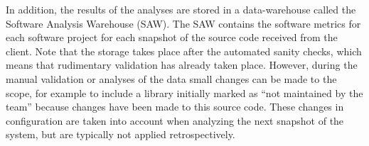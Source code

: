 In addition, the results of the analyses are stored in a data-warehouse called the Software Analysis Warehouse (SAW).
The SAW contains the software metrics for each software project for each snapshot of the source code received from the client.
Note that the storage takes place after the automated sanity checks, which means that rudimentary validation has already taken place.
However, during the manual validation or analyses of the data small changes can be made to the scope, for example to include a library initially marked as ``not maintained by the team'' because changes have been made to this source code.
These changes in configuration are taken into account when analyzing the next snapshot of the system, but are typically not applied retrospectively.  

